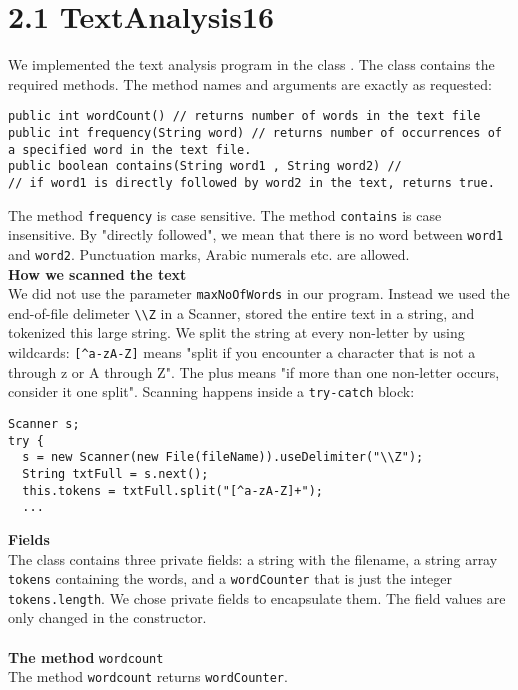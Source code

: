 \section*{2.1 TextAnalysis16}

We implemented the text analysis program in the class . The class contains the required methods. The method names and arguments are exactly as requested:

\begin{lstlisting}
public int wordCount() // returns number of words in the text file
public int frequency(String word) // returns number of occurrences of a specified word in the text file. 
public boolean contains(String word1 , String word2) //
// if word1 is directly followed by word2 in the text, returns true.
\end{lstlisting}

The method \texttt{frequency} is case sensitive. The method \texttt{contains} is case insensitive. By "directly followed", we mean that there is no word between \texttt{word1} and \texttt{word2}. Punctuation marks, Arabic numerals etc. are allowed.\\

\textbf{How we scanned the text}\\
We did not use the parameter \texttt{maxNoOfWords} in our program.  Instead we used the end-of-file delimeter \texttt{\textbackslash \textbackslash Z} in a Scanner, stored the entire text in a string, and tokenized this large string. We split the string  at every non-letter by using wildcards: \texttt{[\textasciicircum a-zA-Z]} means "split if you encounter a character that is not a through z or A through Z". The plus means "if more than one non-letter occurs, consider it one split". Scanning happens inside a \texttt{try-catch} block:

\begin{lstlisting}
Scanner s;
try {
  s = new Scanner(new File(fileName)).useDelimiter("\\Z");
  String txtFull = s.next();
  this.tokens = txtFull.split("[^a-zA-Z]+");
  ...
\end{lstlisting}

\textbf{Fields}\\
The class contains three private fields: a string with the filename, a string array \texttt{tokens} containing the words, and a \texttt{wordCounter} that is just the integer \texttt{tokens.length}. We chose private fields to encapsulate them. The field values are only changed in the constructor.\\
\\
\textbf{The method} \texttt{wordcount}\\
 The method \texttt{wordcount} returns \texttt{wordCounter}.\\

